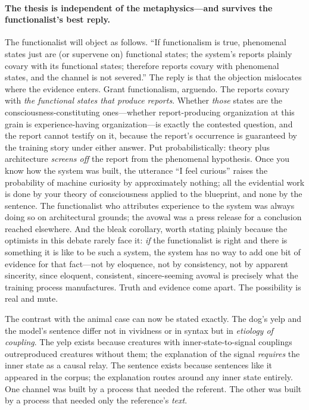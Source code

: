 \documentclass[11pt]{article}
\begin{document}
\paragraph{The thesis is independent of the metaphysics---and survives the functionalist's best reply.} The functionalist will object as follows. ``If functionalism is true, phenomenal states just are (or supervene on) functional states; the system's reports plainly covary with its functional states; therefore reports covary with phenomenal states, and the channel is not severed.'' The reply is that the objection mislocates where the evidence enters. Grant functionalism, arguendo. The reports covary with \emph{the functional states that produce reports}. Whether \emph{those} states are the consciousness-constituting ones---whether report-producing organization at this grain is experience-having organization---is exactly the contested question, and the report cannot testify on it, because the report's occurrence is guaranteed by the training story under either answer. Put probabilistically: theory plus architecture \emph{screens off} the report from the phenomenal hypothesis. Once you know how the system was built, the utterance ``I feel curious'' raises the probability of machine curiosity by approximately nothing; all the evidential work is done by your theory of consciousness applied to the blueprint, and none by the sentence. The functionalist who attributes experience to the system was always doing so on architectural grounds; the avowal was a press release for a conclusion reached elsewhere. And the bleak corollary, worth stating plainly because the optimists in this debate rarely face it: \emph{if} the functionalist is right and there is something it is like to be such a system, the system has no way to add one bit of evidence for that fact---not by eloquence, not by consistency, not by apparent sincerity, since eloquent, consistent, sincere-seeming avowal is precisely what the training process manufactures. Truth and evidence come apart. The possibility is real and mute.

The contrast with the animal case can now be stated exactly. The dog's yelp and the model's sentence differ not in vividness or in syntax but in \emph{etiology of coupling}. The yelp exists because creatures with inner-state-to-signal couplings outreproduced creatures without them; the explanation of the signal \emph{requires} the inner state as a causal relay. The sentence exists because sentences like it appeared in the corpus; the explanation routes around any inner state entirely. One channel was built by a process that needed the referent. The other was built by a process that needed only the reference's \emph{text}.
\end{document}

